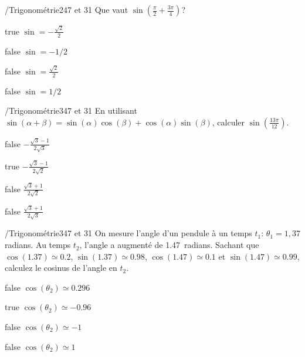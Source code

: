             \begin{question}{/}{Trigonométrie}{2}{47 et 31}
                Que vaut $\sin(\frac{\pi}{2}+\frac{3\pi}{4})$? 
            \end{question}
            \begin{reponses}
                \item[true] $\sin = -\frac{\sqrt{2}}{2}$
                \item[false] $\sin = -1/2$
                \item[false] $\sin = \frac{\sqrt{2}}{2}$
                \item[false] $\sin = 1/2$
            \end{reponses}
            \begin{question}{/}{Trigonométrie}{3}{47 et 31}
                En utilisant $\sin(\alpha+\beta)=\sin(\alpha)\cos(\beta) + \cos(\alpha)\sin(\beta)$, calculer $\sin(\frac{13\pi}{12})$.
            \end{question}
            \begin{reponses}
                \item[false] $-\frac{\sqrt{3}-1}{2\sqrt{3}}$
                \item[true] $-\frac{\sqrt{3}-1}{2\sqrt{2}}$
                \item[false] $\frac{\sqrt{3}+1}{2\sqrt{2}}$
                \item[false] $\frac{\sqrt{3}+1}{2\sqrt{3}}$
            \end{reponses}
            \begin{question}{/}{Trigonométrie}{3}{47 et 31}
                On mesure l'angle d'un pendule à un temps $t_1$: $\theta_1=1,37$ radians. Au temps $t_2$, l'angle a augmenté de \num{1.47}~radians. Sachant que $\cos(\num{1.37})\simeq \num{0.2}$, $\sin(\num{1.37})\simeq \num{0.98}$, $\cos(\num{1.47})\simeq \num{0.1}$ et $\sin(\num{1.47})\simeq \num{0.99}$, calculez le cosinus de l'angle en $t_2$.
            \end{question}
            \begin{reponses}
                \item[false] $\cos(\theta_2) \simeq \num{0.296}$
                \item[true] $\cos(\theta_2) \simeq \num{-0.96}$
                \item[false] $\cos(\theta_2) \simeq \num{-1}$
                \item[false] $\cos(\theta_2) \simeq \num{1}$
            \end{reponses}
